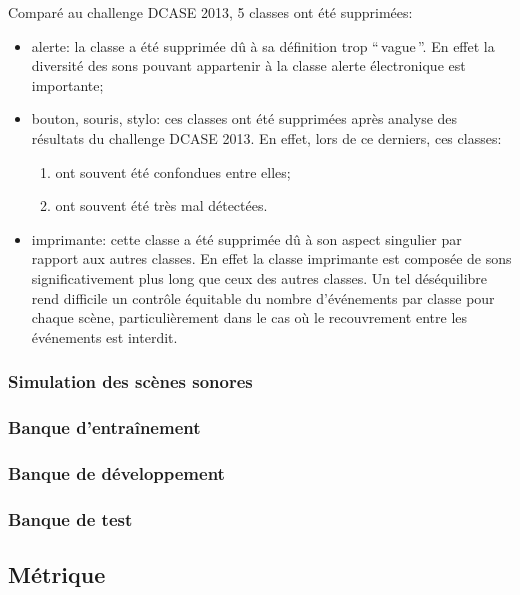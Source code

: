 Comparé au challenge DCASE 2013, 5 classes ont été supprimées:

\begin{itemize}
\item alerte: la classe a été supprimée dû à sa définition trop ``\,vague\,''. En effet la diversité des sons pouvant  appartenir à la classe alerte électronique est importante;

\item bouton, souris, stylo: ces classes ont été supprimées après analyse des résultats du challenge DCASE 2013. En effet, lors de ce derniers, ces classes:

\begin{enumerate}
\item ont souvent été confondues entre elles;
\item ont souvent été très mal détectées. 
\end{enumerate}

\item imprimante: cette classe a été supprimée dû à son aspect singulier par rapport aux autres classes. En effet la classe imprimante est composée de sons significativement plus long que ceux des autres classes. Un tel déséquilibre rend difficile un contrôle équitable du nombre d'événements par classe pour chaque scène, particulièrement dans le cas où le recouvrement entre les événements est interdit.

\end{itemize}

\subsubsection{Simulation des scènes sonores}

\subsubsection{Banque d'entraînement}

\subsubsection{Banque de développement}

\subsubsection{Banque de test}

\subsection{Métrique}

